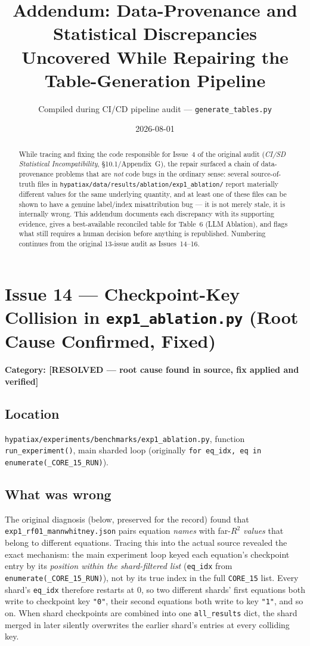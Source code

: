 \documentclass[11pt]{article}
\title{Addendum: Data-Provenance and Statistical Discrepancies\\
Uncovered While Repairing the Table-Generation Pipeline}
\author{Compiled during CI/CD pipeline audit --- \texttt{generate\_tables.py}}
\date{2026-08-01}
\begin{document}
\maketitle

\begin{abstract}
While tracing and fixing the code responsible for Issue~4 of the original
audit (\emph{CI/SD Statistical Incompatibility}, \S10.1/Appendix~G), the
repair surfaced a chain of data-provenance problems that are \emph{not} code
bugs in the ordinary sense: several source-of-truth files in
\texttt{hypatiax/data/results/ablation/exp1\_ablation/} report materially
different values for the same underlying quantity, and at least one of
these files can be shown to have a genuine label/index misattribution bug
--- it is not merely stale, it is internally wrong. This addendum documents
each discrepancy with its supporting evidence, gives a best-available
reconciled table for Table~6 (LLM Ablation), and flags what still requires
a human decision before anything is republished. Numbering continues from
the original 13-issue audit as Issues~14--16.
\end{abstract}

\section*{Issue 14 --- Checkpoint-Key Collision in \texttt{exp1\_ablation.py} (Root Cause Confirmed, Fixed)}
\textbf{Category: [RESOLVED --- root cause found in source, fix applied and verified]}

\subsection*{Location}
\texttt{hypatiax/experiments/benchmarks/exp1\_ablation.py}, function
\texttt{run\_experiment()}, main sharded loop (originally
\texttt{for eq\_idx, eq in enumerate(\_CORE\_15\_RUN)}).

\subsection*{What was wrong}
The original diagnosis (below, preserved for the record) found that
\texttt{exp1\_rf01\_mannwhitney.json} pairs equation \emph{names} with far-$R^2$
\emph{values} that belong to different equations. Tracing this into the
actual source revealed the exact mechanism: the main experiment loop keyed
each equation's checkpoint entry by its \emph{position within the
shard-filtered list} (\texttt{eq\_idx} from \texttt{enumerate(\_CORE\_15\_RUN)}),
not by its true index in the full \texttt{CORE\_15} list. Every shard's
\texttt{eq\_idx} therefore restarts at 0, so two different shards' first
equations both write to checkpoint key \texttt{"0"}, their second equations
both write to key \texttt{"1"}, and so on. When shard checkpoints are
combined into one \texttt{all\_results} dict, the shard merged in later
silently overwrites the earlier shard's entries at every colliding key.
\end{document}
